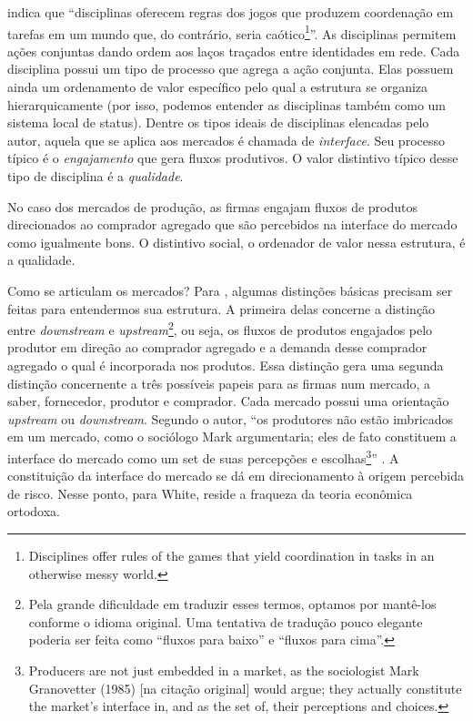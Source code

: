 \documentclass[a4paper, 12pt, openright, oneside, german, french, english, brazil]{abntex2}
\begin{document}
	 indica que ``disciplinas oferecem regras dos jogos que produzem coordenação em tarefas em um mundo que, do contrário, seria caótico\footnote{Disciplines offer rules of the games that yield coordination in tasks in an otherwise messy world.}''. As disciplinas permitem ações conjuntas dando ordem aos laços traçados entre identidades em rede. Cada disciplina possui um tipo de processo que agrega a ação conjunta. Elas possuem ainda um ordenamento de valor específico pelo qual a estrutura se organiza hierarquicamente (por isso, podemos entender as disciplinas também como um sistema local de status). Dentre os tipos ideais de disciplinas elencadas pelo autor, aquela que se aplica aos mercados é chamada de \textit{interface}. Seu processo típico é o \textit{engajamento} que gera fluxos produtivos. O valor distintivo típico desse tipo de disciplina é a \textit{qualidade}.
	
	No caso dos mercados de produção, as firmas engajam fluxos de produtos direcionados ao comprador agregado que são percebidos na interface do mercado como igualmente bons. O distintivo social, o ordenador de valor nessa estrutura, é a qualidade.
	
	Como se articulam os mercados? Para , algumas distinções básicas precisam ser feitas para entendermos sua estrutura. A primeira delas concerne a distinção entre \textit{downstream} e \textit{upstream}\footnote{Pela grande dificuldade em traduzir esses termos, optamos por mantê-los conforme o idioma original. Uma tentativa de tradução pouco elegante poderia ser feita como ``fluxos para baixo'' e ``fluxos para cima''.}, ou seja, os fluxos de produtos engajados pelo produtor em direção ao comprador agregado e a demanda desse comprador agregado o qual é incorporada nos produtos. Essa distinção gera uma segunda distinção concernente a três possíveis papeis para as firmas num mercado, a saber, fornecedor, produtor e comprador. Cada mercado possui uma orientação \textit{upstream} ou \textit{downstream}. Segundo o autor, ``os produtores não estão imbricados em um mercado, como o sociólogo Mark  argumentaria; eles de fato constituem a interface do mercado como um set de suas percepções e escolhas\footnote{Producers are not just embedded in a market, as the sociologist Mark Granovetter (1985) [na citação original] would argue; they actually constitute the market's interface in, and as the set of, their perceptions and choices.}'' \cite[p. 8]{white2002markets}. A constituição da interface do mercado se dá em direcionamento à origem percebida de risco. Nesse ponto, para White, reside a fraqueza da teoria econômica ortodoxa.
	
\end{document}
